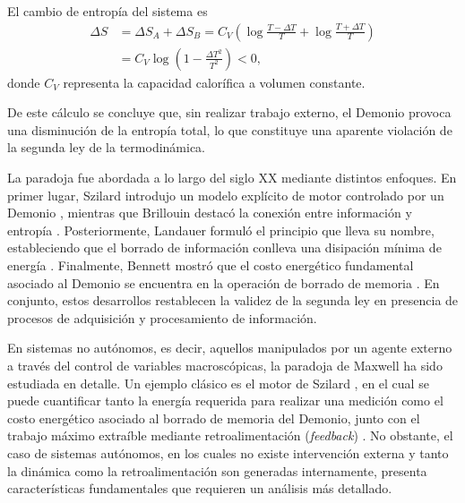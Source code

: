 El cambio de entropía del sistema es
\begin{align*}
    \Delta S & = \Delta S_{A} + \Delta S_{B} = C_{V}\left( \log \frac{T-\Delta T}{T} + \log \frac{T+\Delta T}{T} \right) \\
       & =  C_{V} \log \left( 1 - \frac{\Delta T^{2}}{T^{2}}  \right) < 0,
\end{align*}
donde \( C_V \) representa la capacidad calorífica a volumen constante.

De este cálculo se concluye que, sin realizar trabajo externo, el Demonio provoca una disminución de la entropía total, lo que constituye una aparente violación de la segunda ley de la termodinámica.

La paradoja fue abordada a lo largo del siglo XX mediante distintos enfoques. En primer lugar, Szilard introdujo un modelo explícito de motor controlado por un Demonio \cite{szilard1964decrease}, mientras que Brillouin destacó la conexión entre información y entropía \cite{brillouin1951maxwell}. Posteriormente, Landauer formuló el principio que lleva su nombre, estableciendo que el borrado de información conlleva una disipación mínima de energía \cite{Landauer_1961}. Finalmente, Bennett mostró que el costo energético fundamental asociado al Demonio se encuentra en la operación de borrado de memoria \cite{bennett1982thermodynamics}. En conjunto, estos desarrollos restablecen la validez de la segunda ley en presencia de procesos de adquisición y procesamiento de información.

En sistemas no autónomos, es decir, aquellos manipulados por un agente externo a través del control de variables macroscópicas, la paradoja de Maxwell ha sido estudiada en detalle. Un ejemplo clásico es el motor de Szilard \cite{szilard1964decrease}, en el cual se puede cuantificar tanto la energía requerida para realizar una medición como el costo energético asociado al borrado de memoria del Demonio, junto con el trabajo máximo extraíble mediante retroalimentación (\textit{feedback}) \cite{maruyama2009colloquium, sagawa2008second}. No obstante, el caso de sistemas autónomos, en los cuales no existe intervención externa y tanto la dinámica como la retroalimentación son generadas internamente, presenta características fundamentales que requieren un análisis más detallado.


